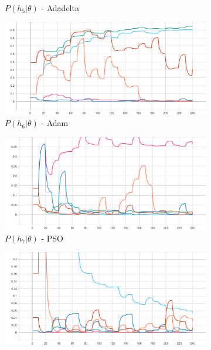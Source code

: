 \begin{figure}[htbp]
\begin{subfigure}{0.5\textwidth}
		\caption{$P\left(h_{5} | \theta \right)$ - \Acs{Adadelta}}
		\label{fig:results:case_study:iris:p_H:5}
	\end{subfigure}
	\par\medskip
	\begin{subfigure}{0.5\textwidth}
		\centering
		\includegraphics[width=\textwidth]{analysis/bhh_case_study/iris/p_H[6].png}
		\caption{$P\left(h_{6} | \theta \right)$ - \Acs{Adam}}
		\label{fig:results:case_study:iris:p_H:6}
	\end{subfigure}
	\begin{subfigure}{0.5\textwidth}
		\centering
		\includegraphics[width=\textwidth]{analysis/bhh_case_study/iris/p_H[7].png}
		\caption{$P\left(h_{7} | \theta \right)$ - \Acs{PSO}}
		\label{fig:results:case_study:iris:p_H:7}
	\end{subfigure}
	\par\medskip
	\begin{subfigure}{0.5\textwidth}
		\centering
		\includegraphics[width=\textwidth]{analysis/bhh_case_study/iris/p_H[8].png}

\end{subfigure}
\end{figure}
